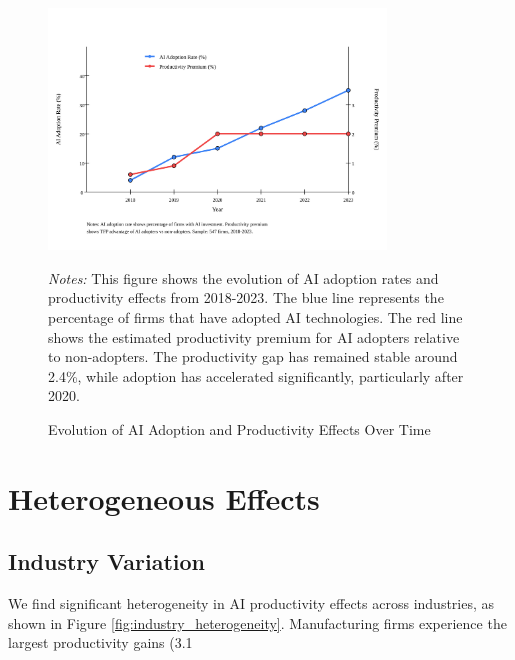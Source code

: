 \documentclass[12pt]{article}
\begin{document}
\begin{figure}[H]
\centering
\includegraphics[width=0.8\textwidth]{figures/figure3_time_series.svg}
\caption{Evolution of AI Adoption and Productivity Effects Over Time}
\label{fig:time_series}
\begin{minipage}{\textwidth}
\footnotesize
\textit{Notes:} This figure shows the evolution of AI adoption rates and productivity effects from 2018-2023. The blue line represents the percentage of firms that have adopted AI technologies. The red line shows the estimated productivity premium for AI adopters relative to non-adopters. The productivity gap has remained stable around 2.4\%, while adoption has accelerated significantly, particularly after 2020.
\end{minipage}
\end{figure}

\section{Heterogeneous Effects}

\subsection{Industry Variation}

We find significant heterogeneity in AI productivity effects across industries, as shown in Figure \ref{fig:industry_heterogeneity}. Manufacturing firms experience the largest productivity gains (3.1%
\end{document}
